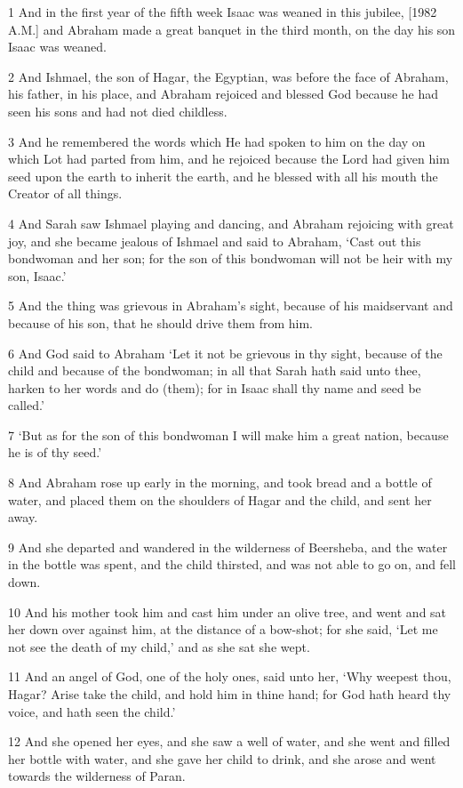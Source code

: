 \par 1 And in the first year of the fifth week Isaac was weaned in this jubilee, [1982 A.M.] and Abraham made a great banquet in the third month, on the day his son Isaac was weaned.
\par 2 And Ishmael, the son of Hagar, the Egyptian, was before the face of Abraham, his father, in his place, and Abraham rejoiced and blessed God because he had seen his sons and had not died childless.
\par 3 And he remembered the words which He had spoken to him on the day on which Lot had parted from him, and he rejoiced because the Lord had given him seed upon the earth to inherit the earth, and he blessed with all his mouth the Creator of all things.
\par 4 And Sarah saw Ishmael playing and dancing, and Abraham rejoicing with great joy, and she became jealous of Ishmael and said to Abraham, ‘Cast out this bondwoman and her son; for the son of this bondwoman will not be heir with my son, Isaac.’
\par 5 And the thing was grievous in Abraham's sight, because of his maidservant and because of his son, that he should drive them from him.
\par 6 And God said to Abraham ‘Let it not be grievous in thy sight, because of the child and because of the bondwoman; in all that Sarah hath said unto thee, harken to her words and do (them); for in Isaac shall thy name and seed be called.’
\par 7 ‘But as for the son of this bondwoman I will make him a great nation, because he is of thy seed.’
\par 8 And Abraham rose up early in the morning, and took bread and a bottle of water, and placed them on the shoulders of Hagar and the child, and sent her away.
\par 9 And she departed and wandered in the wilderness of Beersheba, and the water in the bottle was spent, and the child thirsted, and was not able to go on, and fell down.
\par 10 And his mother took him and cast him under an olive tree, and went and sat her down over against him, at the distance of a bow-shot; for she said, ‘Let me not see the death of my child,’ and as she sat she wept.
\par 11 And an angel of God, one of the holy ones, said unto her, ‘Why weepest thou, Hagar? Arise take the child, and hold him in thine hand; for God hath heard thy voice, and hath seen the child.’
\par 12 And she opened her eyes, and she saw a well of water, and she went and filled her bottle with water, and she gave her child to drink, and she arose and went towards the wilderness of Paran.
